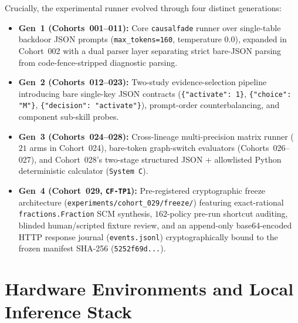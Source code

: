 Crucially, the experimental runner evolved through four distinct generations:
\begin{itemize}
  \item \textbf{Gen~1 (Cohorts~001--011):} Core \texttt{causalfade} runner over single-table backdoor JSON prompts (\texttt{max\_tokens=160}, temperature $0.0$), expanded in Cohort~002 with a dual parser layer separating strict bare-JSON parsing from code-fence-stripped diagnostic parsing.
  \item \textbf{Gen~2 (Cohorts~012--023):} Two-study evidence-selection pipeline introducing bare single-key JSON contracts (\texttt{\{"activate": 1\}}, \texttt{\{"choice": "M"\}}, \texttt{\{"decision": "activate"\}}), prompt-order counterbalancing, and component sub-skill probes.
  \item \textbf{Gen~3 (Cohorts~024--028):} Cross-lineage multi-precision matrix runner ($21$ arms in Cohort~024), bare-token graph-switch evaluators (Cohorts~026--027), and Cohort~028's two-stage structured JSON + allowlisted Python deterministic calculator (\texttt{System C}).
  \item \textbf{Gen~4 (Cohort~029, \texttt{CF-TP1}):} Pre-registered cryptographic freeze architecture (\texttt{experiments/cohort\_029/freeze/}) featuring exact-rational \texttt{fractions.Fraction} SCM synthesis, $162$-policy pre-run shortcut auditing, blinded human/scripted fixture review, and an append-only base64-encoded HTTP response journal (\texttt{events.jsonl}) cryptographically bound to the frozen manifest SHA-256 (\texttt{5252f69d...}).
\end{itemize}

\section{Hardware Environments and Local Inference Stack}

